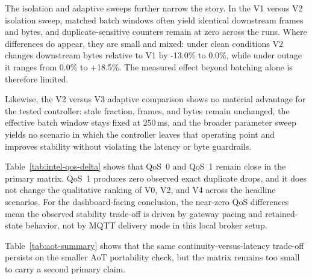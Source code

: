 The isolation and adaptive sweeps further narrow the story. In the V1 versus V2 isolation sweep, matched batch windows often yield identical downstream frames and bytes, and duplicate-sensitive counters remain at zero across the runs. Where differences do appear, they are small and mixed: under clean conditions V2 changes downstream bytes relative to V1 by -13.0\% to 0.0\%, while under outage it ranges from 0.0\% to +18.5\%. The measured effect beyond batching alone is therefore limited.

Likewise, the V2 versus V3 adaptive comparison shows no material advantage for the tested controller: stale fraction, frames, and bytes remain unchanged, the effective batch window stays fixed at 250\,ms, and the broader parameter sweep yields no scenario in which the controller leaves that operating point and improves stability without violating the latency or byte guardrails.



Table~\ref{tab:intel-qos-delta} shows that QoS~0 and QoS~1 remain close in the primary matrix. QoS~1 produces zero observed exact duplicate drops, and it does not change the qualitative ranking of V0, V2, and V4 across the headline scenarios.
For the dashboard-facing conclusion, the near-zero QoS differences mean the observed stability trade-off is driven by gateway pacing and retained-state behavior, not by MQTT delivery mode in this local broker setup.



Table~\ref{tab:aot-summary} shows that the same continuity-versus-latency trade-off persists on the smaller AoT portability check, but the matrix remains too small to carry a second primary claim.
